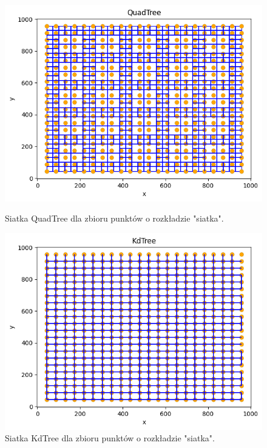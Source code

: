 \documentclass{lab}
\begin{document}
\begin{figure}[H]
  \centering
  \begin{minipage}{0.495\textwidth}
      \centering
      \includegraphics[width=1\textwidth]{resources/grid_QuadTree.png}
      \caption{Siatka QuadTree dla zbioru punktów o rozkładzie "siatka".}
      \label{fig:grid_QuadTree}
  \end{minipage}
  \begin{minipage}{0.495\textwidth}
      \centering
      \includegraphics[width=1\textwidth]{resources/grid_KdTree.png}
      \caption{Siatka KdTree dla zbioru punktów o rozkładzie "siatka".}
      \label{fig:grid_KdTree}
  \end{minipage}
\end{figure}
\end{document}
